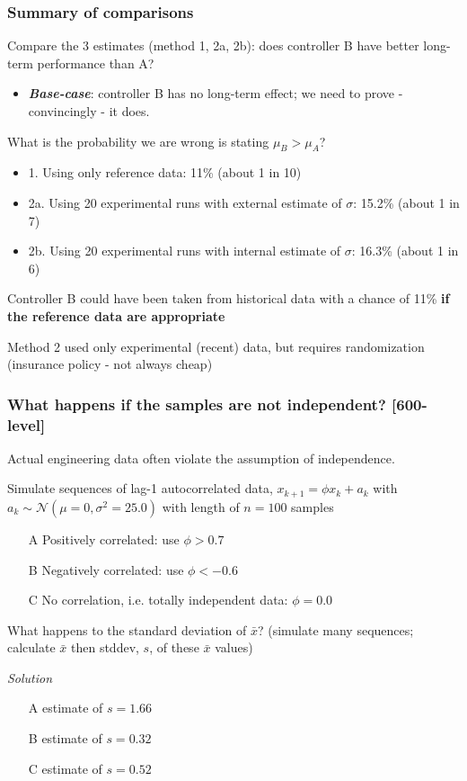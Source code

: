 \begin{frame}\frametitle{Summary of comparisons}

	Compare the 3 estimates (method 1, 2a, 2b): does controller B have better long-term performance than A?
	\begin{itemize}
		\item	\textbf{\emph{Base-case}}: controller B has no long-term effect; we need to prove - convincingly - it does.
	\end{itemize}

	What is the probability we are wrong is stating $\mu_B > \mu_A$?
	\begin{itemize}
		\item	1. Using only reference data: 11\% (about 1 in 10)
		\item	2a. Using 20 experimental runs with external estimate of $\sigma$: 15.2\% (about 1 in 7)
		\item	2b. Using 20 experimental runs with internal estimate of $\sigma$: 16.3\% (about 1 in 6)
	\end{itemize}

	Controller B could have been taken from historical data with a chance of 11\% \textbf{if the reference data are appropriate}

	Method 2 used only experimental (recent) data, but requires randomization (insurance policy - not always cheap)
\end{frame}

\begin{frame}\frametitle{What happens if the samples are not independent? [600-level]}
	Actual engineering data often violate the assumption of independence. 
	
	Simulate sequences of lag-1 autocorrelated data, $x_{k+1} = \phi x_{k} + a_k$ with $a_k \sim \mathcal{N}\left(\mu=0, \sigma^2 = 25.0 \right)$ with length of $n=100$ samples
	\begin{itemize}
		\item[A]	Positively correlated: use $\phi > 0.7$
		\item[B]	Negatively correlated: use $\phi < -0.6$
		\item[C]	No correlation, i.e. totally independent data: $\phi = 0.0$
	\end{itemize}
	
	What happens to the standard deviation of $\bar{x}$? (simulate many sequences; calculate $\bar{x}$ then stddev, $s$, of these $\bar{x}$ values)
	
	\myhrule
	\emph{Solution}
	\begin{itemize}
		\item[A]	estimate of $s = 1.66$
		\item[B]	estimate of $s = 0.32$
		\item[C]	estimate of $s = 0.52$ {}
	\end{itemize}
\end{frame}

